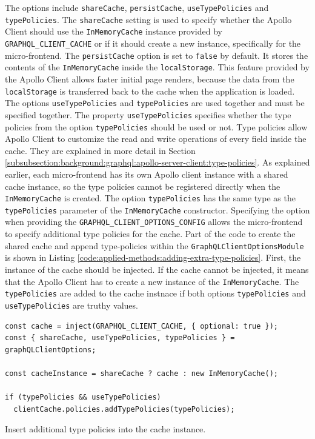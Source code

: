\noindent The options include \texttt{shareCache}, \texttt{persistCache}, \texttt{useTypePolicies} and \texttt{typePolicies}. The \texttt{shareCache} setting is used to specify whether the Apollo Client should use the \texttt{InMemoryCache} instance provided by \texttt{GRAPHQL\_CLIENT\_CACHE} or if it should create a new instance, specifically for the micro-frontend. The \texttt{persistCache} option is set to \texttt{false} by default. It stores the contents of the \texttt{InMemoryCache} inside the \texttt{localStorage}. This feature provided by the Apollo Client allows faster initial page renders, because the data from the \texttt{localStorage} is transferred back to the cache when the application is loaded. The options \texttt{useTypePolicies} and \texttt{typePolicies} are used together and must be specified together. The property \texttt{useTypePolicies} specifies whether the type policies from the option \texttt{typePolicies} should be used or not. Type policies allow Apollo Client to customize the read and write operations of every field inside the cache. They are explained in more detail in Section \ref{subsubsection:background:graphql:apollo-server-client:type-policies}. As explained earlier, each micro-frontend has its own Apollo client instance with a shared cache instance, so the type policies cannot be registered directly when the \texttt{InMemoryCache} is created. The option \texttt{typePolicies} has the same type as the \texttt{typePolicies} parameter of the \texttt{InMemoryCache} constructor. Specifying the option when providing the \texttt{GRAPHQL\_CLIENT\_OPTIONS\_CONFIG} allows the micro-frontend to specify additional type policies for the cache. Part of the code to create the shared cache and append type-policies within the \texttt{GraphQLClientOptionsModule} is shown in Listing \ref{code:applied-methods:adding-extra-type-policies}. First, the instance of the cache should be injected. If the cache cannot be injected, it means that the Apollo Client has to create a new instance of the \texttt{InMemoryCache}. The \texttt{typePolicies} are added to the cache instnace if both options \texttt{typePolicies} and \texttt{useTypePolicies} are truthy values.

\ifshowListings
\begin{listing}[H]
\begin{verbatim}
const cache = inject(GRAPHQL_CLIENT_CACHE, { optional: true });
const { shareCache, useTypePolicies, typePolicies } = graphQLClientOptions;

const cacheInstance = shareCache ? cache : new InMemoryCache();

if (typePolicies && useTypePolicies)
  clientCache.policies.addTypePolicies(typePolicies);
\end{verbatim}
\caption{Insert additional type policies into the cache instance.}\label{code:applied-methods:adding-extra-type-policies}
\end{listing}
\fi
